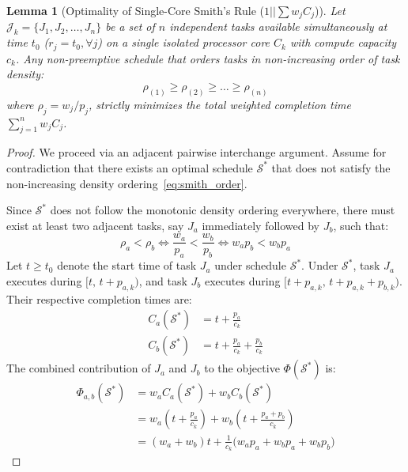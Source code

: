 \documentclass[conference]{IEEEtran}
\newtheorem{lemma}{Lemma}
\begin{document}
\begin{lemma}[Optimality of Single-Core Smith's Rule ($1 || \sum w_j C_j$)]
\label{lem:smith_single}
Let $\mathcal{J}_k = \{J_1, J_2, \dots, J_n\}$ be a set of $n$ independent tasks available simultaneously at time $t_0$ ($r_j = t_0, \forall j$) on a single isolated processor core $C_k$ with compute capacity $c_k$. Any non-preemptive schedule that orders tasks in non-increasing order of task density:
\begin{equation}
\label{eq:smith_order}
\rho_{(1)} \ge \rho_{(2)} \ge \dots \ge \rho_{(n)}
\end{equation}
where $\rho_j = w_j / p_j$, strictly minimizes the total weighted completion time $\sum_{j=1}^n w_j C_j$.
\end{lemma}

\begin{proof}
We proceed via an adjacent pairwise interchange argument. Assume for contradiction that there exists an optimal schedule $\mathcal{S}^*$ that does not satisfy the non-increasing density ordering~\eqref{eq:smith_order}.

Since $\mathcal{S}^*$ does not follow the monotonic density ordering everywhere, there must exist at least two adjacent tasks, say $J_a$ immediately followed by $J_b$, such that:
\begin{equation}
\label{eq:inv_cond}
\rho_a < \rho_b \iff \frac{w_a}{p_a} < \frac{w_b}{p_b} \iff w_a p_b < w_b p_a
\end{equation}
Let $t \ge t_0$ denote the start time of task $J_a$ under schedule $\mathcal{S}^*$. Under $\mathcal{S}^*$, task $J_a$ executes during $[t, \, t + p_{a,k})$, and task $J_b$ executes during $[t + p_{a,k}, \, t + p_{a,k} + p_{b,k})$. Their respective completion times are:
\begin{align}
C_a(\mathcal{S}^*) &= t + \frac{p_a}{c_k} \\
C_b(\mathcal{S}^*) &= t + \frac{p_a}{c_k} + \frac{p_b}{c_k}
\end{align}
The combined contribution of $J_a$ and $J_b$ to the objective $\Phi(\mathcal{S}^*)$ is:
\begin{align}
\Phi_{a,b}(\mathcal{S}^*) &= w_a C_a(\mathcal{S}^*) + w_b C_b(\mathcal{S}^*) \nonumber \\
&= w_a \left( t + \frac{p_a}{c_k} \right) + w_b \left( t + \frac{p_a + p_b}{c_k} \right) \nonumber \\
&= (w_a + w_b)t + \frac{1}{c_k} \Big( w_a p_a + w_b p_a + w_b p_b \Big)
\end{align}


\end{proof}
\end{document}
